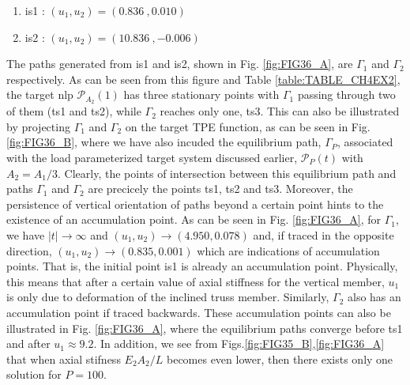 \begin{enumerate}
	\item \acrshort{is}1 : $(u_1,u_2) = (0.836\ , 0.010)$
	\item \acrshort{is}2 : $(u_1,u_2) = (10.836\ ,-0.006)$
\end{enumerate}
The paths generated from \acrshort{is}1 and \acrshort{is}2, shown in Fig. 
\ref{fig:FIG36_A}, are 
$\mathit{\Gamma}_1$ and $\mathit{\Gamma}_2$ respectively. As can be seen from 
this figure and Table
\ref{table:TABLE_CH4EX2}, the target \acrshort{nlp} $\bm{\mathcal{P}}_{A_2}(1)$ 
has three stationary points with $\mathit{\Gamma}_1$ passing through two of 
them (\acrshort{ts}1 and \acrshort{ts}2),
while $\mathit{\Gamma}_2$ reaches only one, \acrshort{ts}3. This can also be 
illustrated by
projecting $\mathit{\Gamma}_1$ and $\mathit{\Gamma}_2$ on the target TPE 
function, as can be seen
in Fig. \ref{fig:FIG36_B}, where we have also incuded the equilibrium path,
$\mathit{\Gamma}_P$, associated with
the load parameterized target system discussed earlier,
$\bm{\mathcal{P}}_P(t)$ with $A_2=
A_1^{}/3$. Clearly, the points of intersection between this equilibrium path and
paths $\mathit{\Gamma}_1$ and $\mathit{\Gamma}_2$ are precicely the points 
\acrshort{ts}1, 
\acrshort{ts}2 and \acrshort{ts}3.
Moreover, the persistence of vertical
orientation of paths beyond a certain point hints to the existence
of an accumulation point. As can be seen in Fig. \ref{fig:FIG36_A}, for 
$\mathit{\Gamma}_1$, we
have $\vert t\vert\rightarrow \infty$ and $(u_1,u_2)\rightarrow
(4.950,0.078)$ and, if traced in the opposite direction, $(u_1,u_2)\rightarrow
(0.835,0.001)$ which are indications of accumulation points. That is, the 
initial point \acrshort{is}1 is already an accumulation point. Physically, this means 
that
after a certain value of axial stiffness for the vertical member, $u_1$ is only
due to deformation of the inclined truss member. Similarly,
$\mathit{\Gamma}_2$ also has an accumulation point if traced backwards. These 
accumulation points can also be illustrated in Fig.
\ref{fig:FIG36_A}, where the equilibrium paths converge before \acrshort{ts}1 and after
$u_1\approx 9.2$. In addition, we see from
Figs.\ref{fig:FIG35_B},\ref{fig:FIG36_A} that when axial stifness
$E_2A_2^{}/L$ becomes even lower, then there exists only one solution for
$P=100$.


